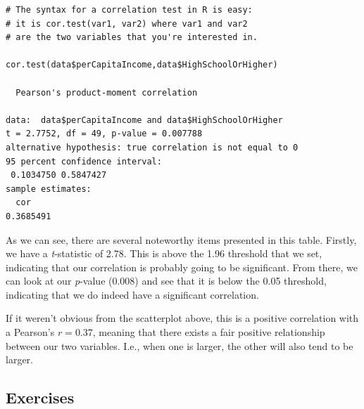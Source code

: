 \begin{framed}
\begin{Verbatim}[samepage=TRUE]
# The syntax for a correlation test in R is easy:
# it is cor.test(var1, var2) where var1 and var2
# are the two variables that you're interested in.

cor.test(data$perCapitaIncome,data$HighSchoolOrHigher)

  Pearson's product-moment correlation

data:  data$perCapitaIncome and data$HighSchoolOrHigher
t = 2.7752, df = 49, p-value = 0.007788
alternative hypothesis: true correlation is not equal to 0
95 percent confidence interval:
 0.1034750 0.5847427
sample estimates:
  cor 
0.3685491 
\end{Verbatim}
\end{framed}

As we can see, there are several noteworthy items presented in this table. Firstly, we have a \textit{t}-statistic of 2.78. This is above the 1.96 threshold that we set, indicating that our correlation is probably going to be significant. From there, we can look at our \textit{p}-value (0.008) and see that it is below the 0.05 threshold, indicating that we do indeed have a significant correlation.

If it weren't obvious from the scatterplot above, this is a positive correlation with a Pearson's $r=0.37$, meaning that there exists a fair positive relationship between our two variables. I.e., when one is larger, the other will also tend to be larger.

\subsection{Exercises}


